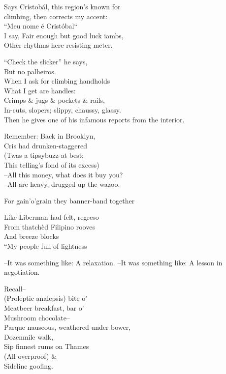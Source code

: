 
Says Crístobál, this region's known for \\
climbing, then corrects my accent: \\
``Meu nome é Cristóbal`` \\
I say, Fair enough but good luck iambs, \\
Other rhythms here resisting meter.

``Check the slicker'' he says, \\
But no palheiros. \\
When I ask for climbing handholds \\
What I get are handles: \\
Crimps \& jugs \& pockets \& rails, \\
In-cuts, slopers; slippy, chaussy, glassy. \\

Then he gives one of his infamous reports from the interior.

Remember: Back in Brooklyn, \\
Cris had drunken-staggered \\
(Twas a tipsybuzz at best; \\
This telling’s fond of its excess) \\

--All this money, what does it buy you? \\
--All are heavy, drugged up the wazoo.

For gain’o’grain they banner-band together

Like Liberman had felt, regreso \\
From thatchèd Filipino rooves \\
And breeze blocks \\
``My people full of lightness

--It was something like: A relaxation.
--It was something like: A lesson in negotiation.

Recall-- \\
(Proleptic analepsis) bite o' \\
Meatbeer breakfast, bar o' \\
Mushroom chocolate-- \\
Parque nauseous, weathered under bower, \\
Dozenmile walk, \\
Sip finnest rums on Thames \\
(All overproof) \& \\
Sideline goofing.

